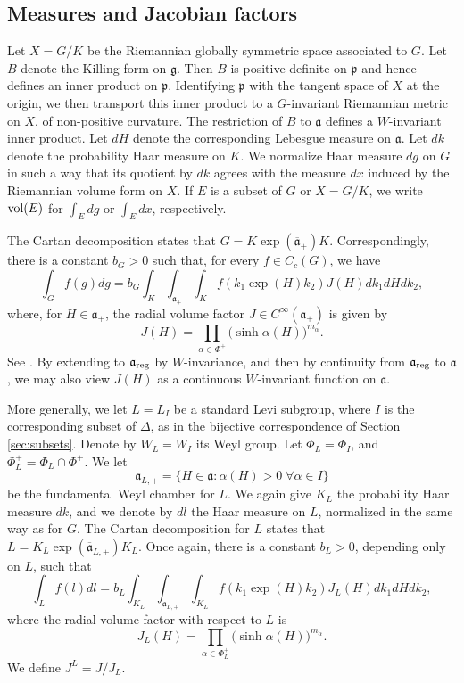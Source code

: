\documentclass[12pt]{amsart}
\theoremstyle{remark}
\newcommand{\g}{\mathfrak g}
\newcommand{\ga}{\mathfrak a}
\newcommand{\be}{\begin{equation}}
\newcommand{\ee}{\end{equation}}
\begin{document}
\subsection{Measures and Jacobian factors}\label{sec:Jacobian}
Let $X=G/K$ be the Riemannian globally symmetric space associated to $G$. Let $B$ denote the Killing form on $\g$. Then $B$ is positive definite on $\mathfrak{p}$ and hence defines an inner product on $\mathfrak{p}$. Identifying $\mathfrak{p}$ with the tangent space of $X$ at the origin, we then transport this inner product to a $G$-invariant Riemannian metric on $X$, of non-positive curvature. The restriction of $B$ to $\mathfrak{a}$ defines a $W$-invariant inner product. Let $dH$ denote the corresponding Lebesgue measure on $\mathfrak{a}$. Let $dk$ denote the probability Haar measure on $K$. We normalize Haar measure $dg$ on $G$ in such a way that its quotient by $dk$ agrees with the measure $dx$ induced by the Riemannian volume form on $X$. If $E$ is a subset of $G$ or $X=G/K$, we write ${\rm vol}(E)$ for $\int_E dg$ or $\int_E dx$, respectively.

The Cartan decomposition states that $G = K \exp(\overline{\mathfrak{a}}_+)K$. Correspondingly, there is a constant $b_G>0$ such that, for every $f\in C_c(G)$, we have 
\begin{equation}\label{eq:Cartan-int}
\int_G f(g)dg = b_G\int_K\int_{\mathfrak{a}_+}\int_K f(k_1 \exp(H) k_2) J(H) dk_1dH dk_2,
\end{equation}
where, for $H \in \mathfrak{a}_+$, the radial volume factor $J \in C^\infty(\ga_+)$ is given by
\begin{equation}\label{eq:def:J}
 J(H) =\prod_{\alpha\in \Phi^+}\big(\sinh \alpha(H) \big)^{m_\alpha}.
\end{equation}
See \cite[\S 2.4, Prop. 2.4.11]{Gangolli_Varadarajan_88}. By extending to $\ga_{\rm reg}$ by $W$-invariance, and then by continuity from $\ga_{\rm reg}$ to $\ga$, we may also view $J(H)$ as a continuous $W$-invariant function on $\ga$.

More generally, we let $L=L_I$ be a standard Levi subgroup, where $I$ is the corresponding subset of $\Delta$, as in the bijective correspondence of Section \ref{sec:subsets}. Denote by $W_L = W_I$ its Weyl group. Let $\Phi_L = \Phi_I$, and $\Phi_L^+ = \Phi_L \cap \Phi^+$. We let
\be
\label{aLdef}
\ga_{L,+} = \{ H \in \ga : \alpha(H) > 0 \; \forall \alpha \in I \}
\ee
be the fundamental Weyl chamber for $L$. We again give $K_L$ the probability Haar measure $dk$, and we denote by $dl$ the Haar measure on $L$, normalized in the same way as for $G$. The Cartan decomposition for $L$ states that $L=K_L\exp(\overline{\ga}_{L,+})K_L$. Once again, there is a constant $b_L>0$, depending only on $L$, such that 
\begin{equation}\label{L-int-formula}
\int_L f(l)dl = b_L \int_{K_L}\int_{\ga_{L,+}}\int_{K_L} f(k_1\exp(H)k_2)J_L(H) dk_1dH dk_2,
\end{equation}
where the radial volume factor with respect to $L$ is
\begin{equation}\label{eq:def:JM}
 J_L(H)=\prod_{\alpha\in \Phi_L^+} \big(\sinh\alpha(H) \big)^{m_\alpha}.
\end{equation}
We define $J^L = J / J_L$.
\end{document}
